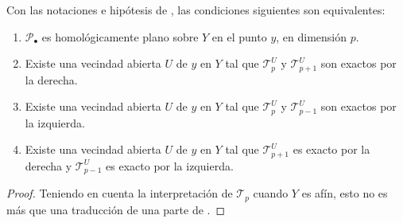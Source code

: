 \begin{proposition}[7.8.3]
\label{III.7.8.3}
Con las notaciones e hipótesis de \textup{}, las condiciones
siguientes son equivalentes:
\begin{enumerate}
  \item[\textup{a)}] $\mathscr P_\bullet$ es homológicamente plano sobre $Y$
    en el punto $y$, en dimensión $p$.
  \item[\textup{b)}] Existe una vecindad abierta $U$ de $y$ en $Y$ tal que
    $\mathscr T_p^U$ y $\mathscr T_{p+1}^U$ son exactos por la
    derecha.
  \item[\textup{c)}] Existe una vecindad abierta $U$ de $y$ en $Y$ tal que
    $\mathscr T_p^U$ y $\mathscr T_{p-1}^U$ son exactos por la
    izquierda.
  \item[\textup{d)}] Existe una vecindad abierta $U$ de $y$ en $Y$ tal que
    $\mathscr T_{p+1}^U$ es exacto por la derecha y
    $\mathscr T_{p-1}^U$ es exacto por la izquierda.
\end{enumerate}
\end{proposition}

\begin{proof}
Teniendo en cuenta la interpretación de $\mathscr T_p$ cuando $Y$
es afín, esto no es más que una traducción de una parte de
.
\end{proof}

